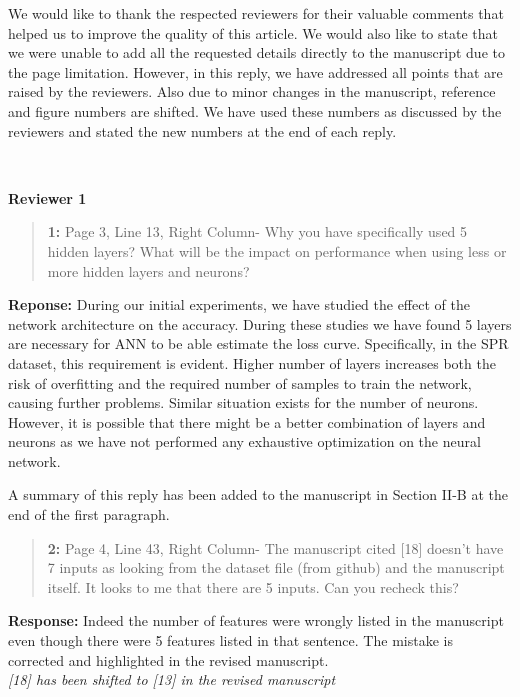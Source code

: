 \documentclass{article}
\begin{document}
	
	We would like to thank the respected reviewers for their valuable comments that helped us to improve the quality of this article. We would also like to state that we were unable to add all the requested details directly to the manuscript due to the page limitation. However, in this reply, we have addressed all points that are raised by the reviewers. Also due to minor changes in the manuscript, reference and figure numbers are shifted. We have used these numbers as discussed by the reviewers and stated the new numbers at the end of each reply.
	
	~
	
	{\bfseries\large Reviewer 1}
	
	\begin{quote}
		\textbf{1: }Page 3, Line 13, Right Column- Why you have specifically used 5 hidden layers? What will be the impact on performance when using less or more hidden layers and neurons?
	\end{quote}
	
	\textbf{Reponse: }During our initial experiments, we have studied the effect of the network architecture on the accuracy. During these studies we have found 5 layers are necessary for ANN to be able estimate the loss curve. Specifically, in the SPR dataset, this requirement is evident. Higher number of layers increases both the risk of overfitting and the required number of samples to train the network, causing further problems. Similar situation exists for the number of neurons. However, it is possible that there might be a better combination of layers and neurons as we have not performed any exhaustive optimization on the neural network.
	
	A summary of this reply has been added to the manuscript in Section II-B at the end of the first paragraph.
	
	\begin{quote}
		\textbf{2: }Page 4, Line 43, Right Column- The manuscript cited [18] doesn't have 7 inputs as looking from the dataset file (from github) and the manuscript itself. It looks to me that there are 5 inputs. Can you recheck this?
	\end{quote}
	
	\textbf{Response:} Indeed the number of features were wrongly listed in the manuscript even though there were 5 features listed in that sentence. The mistake is corrected and highlighted in the revised manuscript. \\
	\textit{[18] has been shifted to [13] in the revised manuscript}
	
\end{document}

